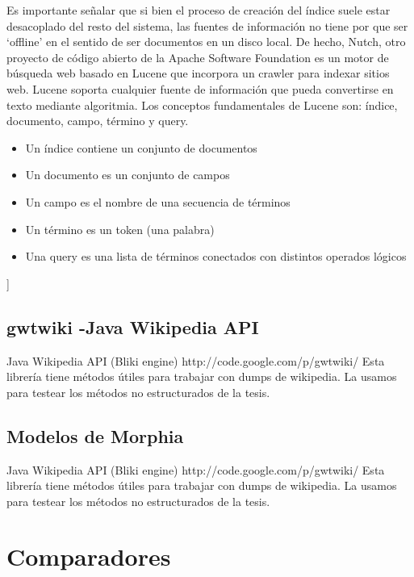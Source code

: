 Es importante señalar que si bien el proceso de creaci\'on del índice suele estar desacoplado del resto 
del sistema, las fuentes de informaci\'on no tiene por que ser `offline' en el sentido de ser documentos
en un disco local. De hecho, Nutch, otro proyecto de c\'odigo abierto de la Apache Software Foundation es 
un motor de búsqueda web basado en Lucene que incorpora un crawler para indexar sitios web. Lucene soporta 
cualquier fuente de informaci\'on que pueda convertirse en texto mediante algoritmia.
\newline
Los conceptos fundamentales de Lucene son: índice, documento, campo, término y query.
\begin{itemize}
\item Un índice contiene un conjunto de documentos
\item Un documento es un conjunto de campos
\item Un campo es el nombre de una secuencia de términos
\item Un término es un token (una palabra)
\item Una query es una lista de términos conectados con distintos operados l\'ogicos
\end{itemize}

\bigskip
[[Dar ejemplos de una query]]
\bigskip

\section{gwtwiki -Java Wikipedia API}\label{sec:gwtwiki}

Java Wikipedia API (Bliki engine)
http://code.google.com/p/gwtwiki/
Esta librería tiene métodos útiles para trabajar con dumps de wikipedia. La usamos para testear los métodos no estructurados de la tesis.


\section{Modelos de Morphia}\label{sec:modelos-morphia}

Java Wikipedia API (Bliki engine)
http://code.google.com/p/gwtwiki/
Esta librería tiene métodos útiles para trabajar con dumps de wikipedia. La usamos para testear los métodos no estructurados de la tesis.


\chapter{Comparadores}
\label{sec:comparadores}

